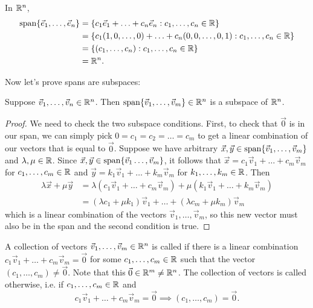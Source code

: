 \documentclass[main.tex]{subfiles}
\begin{document}
\begin{example}
    In $\mathbb R^n$,
    \begin{align*}
        \operatorname{span}\{\vec{e}_1, \ldots, \vec{e}_n\} &= \{c_1\vec{e}_1 + \ldots + c_n\vec{e}_n : c_1, \ldots , c_n\in \mathbb R\} \\
        &= \{c_1(1, 0,\ldots , 0) + \ldots + c_n(0, 0, \ldots , 0, 1) : c_1, \ldots , c_n \in \mathbb R\} \\
        &= \{(c_1, \ldots , c_n) : c_1, \ldots , c_n \in \mathbb R\} \\
        &= \mathbb R^n.
    \end{align*}
\end{example}

Now let's prove spans are subspaces:
\begin{lemma}
    Suppose $\vec{v}_1, \ldots , \vec{v}_n\in \mathbb R^n$. Then $\operatorname{span}\{\vec{v}_1, \ldots , \vec{v}_m\}\in \mathbb R^n$ is a subspace of $\mathbb R^n$.
\end{lemma}

\begin{proof}
    We need to check the two subspace conditions. First, to check that $\vec{0}$ is in our span, we can simply pick $0 = c_1 = c_2 = \ldots = c_m$ to get a linear combination of our vectors that is equal to $\vec{0}$. Suppose we have arbitrary $\vec{x}, \vec{y}\in \operatorname{span}\{\vec{v}_1, \ldots , \vec{v}_m\}$ and $\lambda, \mu \in \mathbb R$. Since $\vec{x}, \vec{y}\in \operatorname{span}\{\vec{v}_1 \ldots , \vec{v}_m\}$, it follows that $\vec{x} = c_1\vec{v}_1 + \ldots + c_m\vec{v}_m$ for $c_1, \ldots , c_m\in \mathbb R$ and $\vec{y} = k_1\vec{v}_1 + \ldots + k_m\vec{v}_m$ for $k_1, \ldots , k_m\in \mathbb R$. Then
    \begin{align*}
        \lambda \vec{x} + \mu \vec{y} &= \lambda (c_1\vec{v}_1 + \ldots + c_m\vec{v}_m) + \mu (k_1\vec{v}_1 + \ldots + k_m\vec{v}_m)\\
        &= (\lambda c_1 + \mu k_1) \vec{v}_1 + \ldots + (\lambda c_m + \mu k_m)\vec{v}_m
    \end{align*}
    which is a linear combination of the vectors $\vec{v}_1 , \ldots , \vec{v}_m$, so this new vector must also be in the span and the second condition is true.
\end{proof}

\begin{definition}
    A collection of vectors $\vec{v}_1, \ldots , \vec{v}_m\in \mathbb R^n$ is called  if there is a linear combination $c_1\vec{v}_1 + \ldots + c_m\vec{v}_m = \vec{0}$ for some $c_1, \ldots , c_m\in \mathbb R$ such that the vector $(c_1, \ldots , c_m) \neq \vec{0}$. Note that this $\vec{0}\in \mathbb R^m\neq \mathbb R^n$. The collection of vectors is called  otherwise, i.e. if $c_1, \ldots , c_m\in \mathbb R$ and
    \[c_1\vec{v}_1 + \ldots + c_m\vec{v}_m = \vec{0}\implies (c_1, \ldots , c_m) = \vec{0}.\]
\end{definition}
\end{document}

